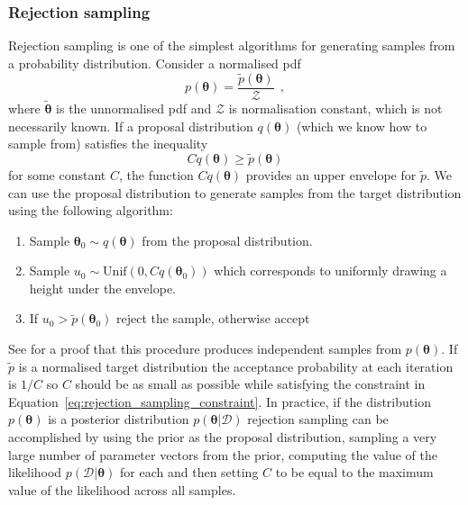 \documentclass[12pt,dvipsnames]{report}
\renewcommand{\vec}[1]{\boldsymbol{\mathbf{#1}}}
\newcommand{\hquad}{~~}
\begin{document}
\subsubsection{Rejection sampling}
Rejection sampling is one of the simplest algorithms for generating samples
from a probability distribution. Consider a normalised pdf
\begin{equation}
    p(\vec{\theta})=\frac{\tilde{p}(\vec{\theta})}{\mathcal{Z}}
    \hquad,
\end{equation}
where $\tilde{\vec{\theta}}$ is the unnormalised pdf and $\mathcal{Z}$ is normalisation
constant, which is not necessarily known.
If a proposal distribution $q(\vec{\theta})$ (which we know how to sample from)
satisfies the inequality
\begin{equation}
    Cq(\vec{\theta})\geq \tilde{p}(\vec{\theta})
    \label{eq:rejection_sampling_constraint}
\end{equation}
for some constant $C$, the function $Cq(\vec{\theta})$ provides an upper envelope for
$\tilde{p}$. We can use the proposal distribution to generate samples from the target
distribution using the following algorithm:
\begin{enumerate}
    \item Sample $\vec{\theta}_0\sim q(\vec{\theta})$ from the proposal distribution.
    \item Sample $u_0\sim \mathrm{Unif}(0, Cq(\vec{\theta}_0))$ which corresponds to
          uniformly drawing a height under the envelope.
    \item If $u_0>\tilde{p}(\vec{\theta}_0)$ reject the sample, otherwise accept
\end{enumerate}
See \citet{murphy_book_2023} for a proof that this procedure produces independent samples 
from $p(\vec \theta)$.
If $\tilde{p}$ is a normalised target distribution the acceptance probability at
each iteration is  $1/C$  so  $C$ should be as small as possible
while satisfying the constraint in Equation~\ref{eq:rejection_sampling_constraint}.
In practice, if the distribution $p(\vec{\theta})$ is a posterior distribution
$p(\vec{\theta}\lvert \mathcal{D})$ rejection sampling can be accomplished by using
the prior as the proposal distribution, sampling a very large number of parameter
vectors from the prior, computing the value of the likelihood
$p(\mathcal{D} \lvert\vec{\theta})$ for each and then setting $C$ to be equal to the
maximum value of the likelihood across all samples.
\end{document}
